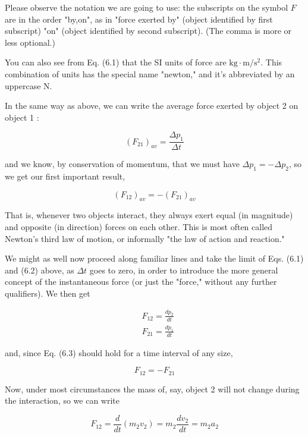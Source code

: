 \documentclass[10pt]{article}
\begin{document}
Please observe the notation we are going to use: the subscripts on the symbol $F$ are in the order "by,on", as in "force exerted by" (object identified by first subscript) "on" (object identified by second subscript). (The comma is more or less optional.)

You can also see from Eq. (6.1) that the SI units of force are $\mathrm{kg} \cdot \mathrm{m} / \mathrm{s}^{2}$. This combination of units has the special name "newton," and it's abbreviated by an uppercase N.

In the same way as above, we can write the average force exerted by object 2 on object 1 :


\begin{equation*}
\left(F_{21}\right)_{a v}=\frac{\Delta p_{1}}{\Delta t} \tag{6.2}
\end{equation*}


and we know, by conservation of momentum, that we must have $\Delta p_{1}=-\Delta p_{2}$, so we get our first important result,


\begin{equation*}
\left(F_{12}\right)_{a v}=-\left(F_{21}\right)_{a v} \tag{6.3}
\end{equation*}


That is, whenever two objects interact, they always exert equal (in magnitude) and opposite (in direction) forces on each other. This is most often called Newton's third law of motion, or informally "the law of action and reaction."

We might as well now proceed along familiar lines and take the limit of Eqs. (6.1) and (6.2) above, as $\Delta t$ goes to zero, in order to introduce the more general concept of the instantaneous force (or just the "force," without any further qualifiers). We then get


\begin{align*}
& F_{12}=\frac{d p_{2}}{d t} \\
& F_{21}=\frac{d p_{1}}{d t} \tag{6.4}
\end{align*}


and, since Eq. (6.3) should hold for a time interval of any size,


\begin{equation*}
F_{12}=-F_{21} \tag{6.5}
\end{equation*}


Now, under most circumstances the mass of, say, object 2 will not change during the interaction, so we can write


\begin{equation*}
F_{12}=\frac{d}{d t}\left(m_{2} v_{2}\right)=m_{2} \frac{d v_{2}}{d t}=m_{2} a_{2} \tag{6.6}
\end{equation*}
\end{document}
